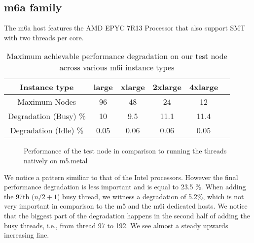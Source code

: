 \subsection{m6a family}
The m6a host features the AMD EPYC 7R13 Processor that also support \ac{SMT} with two threads per core.

\begin{table}[H]
\begin{center}
\begin{tabular}{ |c|c|c|c|c|c }
 Instance type & large & xlarge & 2xlarge & 4xlarge \\
 \hline
 Maximum Nodes & 96 & 48 & 24 & 12  \\
 \hline
Degradation (Busy) \% & 10 & 9.5 & 11.1 & 11.4  \\ 
\hline 
Degradation (Idle) \% & 0.05 & 0.06 & 0.06 & 0.05  \\ 
\end{tabular}
\end{center}
\caption{Maximum achievable performance degradation on our test node across various m6i instance types}
\label{tab::max_m6a}
\end{table}


\begin{figure}[H]
\caption{Performance of the test node in comparison to running the threads natively on m5.metal}
\label{fig::m6a_metal_vs_VMs}
\end{figure}
\noindent
We notice a pattern similiar to that of the Intel processors. However the final performance degradation is 
less important and is equal to 23.5 \%. When adding the 97th ($n/2 + 1$) busy thread, we witness a degradation 
of 5.2\%, which is not very important in comparison to the m5 and the m6i dedicated hosts. 
We notice that the biggest part of the degradation happens in the second half of adding the 
busy threads, i.e., from thread 97 to 192. We see almost a steady upwards increasing line. 